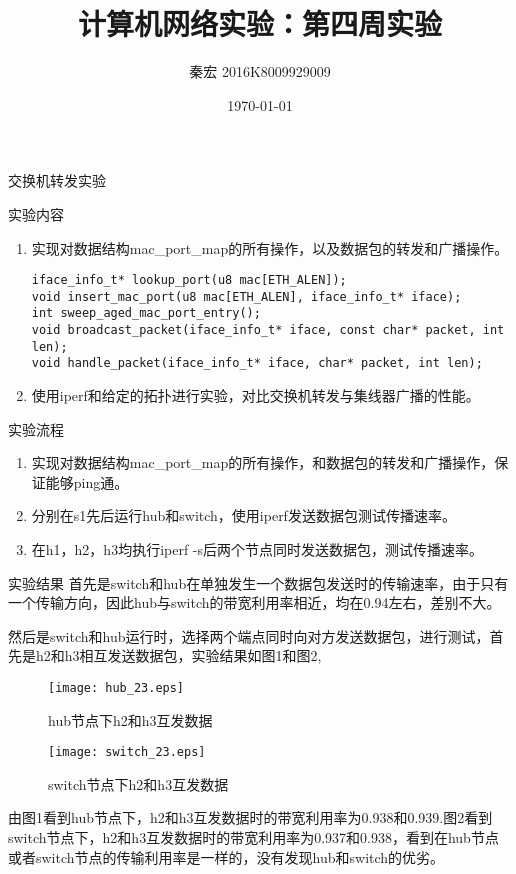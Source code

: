 \documentclass{article} %
\title{计算机网络实验：第四周实验}  %
\author{秦宏 2016K8009929009}   %
\date{\today}       %
\begin{document}
	\maketitle          %
	\begin{section}{交换机转发实验}
		\begin{subsection}{实验内容}
			\begin{enumerate}[1)]
				\item 实现对数据结构mac\_port\_map的所有操作，以及数据包的转发和广播操作。
					\begin{lstlisting}[language={[ANSI]C}]
iface_info_t* lookup_port(u8 mac[ETH_ALEN]);
void insert_mac_port(u8 mac[ETH_ALEN], iface_info_t* iface);
int sweep_aged_mac_port_entry();
void broadcast_packet(iface_info_t* iface, const char* packet, int len);
void handle_packet(iface_info_t* iface, char* packet, int len);
					\end{lstlisting}
				\item 使用iperf和给定的拓扑进行实验，对比交换机转发与集线器广播的性能。	
			\end{enumerate}
			\end{subsection}
		\begin{subsection}{实验流程}
			\begin{enumerate}[1)]
				\item 实现对数据结构mac\_port\_map的所有操作，和数据包的转发和广播操作，保证能够ping通。
				\item 分别在s1先后运行hub和switch，使用iperf发送数据包测试传播速率。
				\item 在h1，h2，h3均执行iperf -s后两个节点同时发送数据包，测试传播速率。
			\end{enumerate}
			\end{subsection}
		\begin{subsection}{实验结果}
		首先是switch和hub在单独发生一个数据包发送时的传输速率，由于只有一个传输方向，因此hub与switch的带宽利用率相近，均在0.94左右，差别不大。\vspace{3pt}
		
		然后是switch和hub运行时，选择两个端点同时向对方发送数据包，进行测试，首先是h2和h3相互发送数据包，实验结果如图1和图2,
		\begin{figure}[hp]	
			\centering
			\texttt{[image: hub\_23.eps]}	
			\caption{hub节点下h2和h3互发数据}
		\end{figure}
		\begin{figure}[hp]	
			\centering
			\texttt{[image: switch\_23.eps]}	
			\caption{switch节点下h2和h3互发数据}
		\end{figure}
		由图1看到hub节点下，h2和h3互发数据时的带宽利用率为0.938和0.939.图2看到switch节点下，h2和h3互发数据时的带宽利用率为0.937和0.938，看到在hub节点或者switch节点的传输利用率是一样的，没有发现hub和switch的优劣。\vspace{3pt}
		

\end{subsection}
\end{section}
\end{document}
